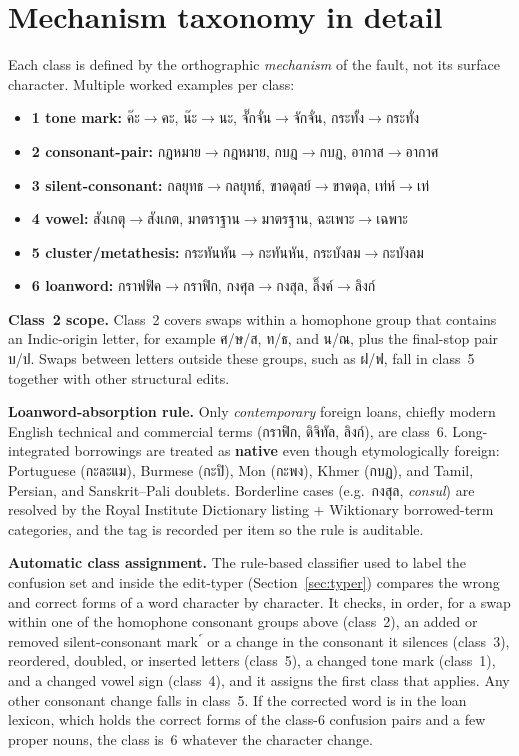 \documentclass[11pt]{article}
\begin{document}
\section{Mechanism taxonomy in detail}
\label{app:taxonomy}
Each class is defined by the orthographic \emph{mechanism} of the fault, not its surface
character. Multiple worked examples per class:
\begin{itemize}\raggedright\itemsep1pt
\item \textbf{1 tone mark:} ค๊ะ$\to$คะ, น๊ะ$\to$นะ, จั๊กจั่น$\to$จักจั่น, กระทั้ง$\to$กระทั่ง
\item \textbf{2 consonant-pair:} กฏหมาย$\to$กฎหมาย, กบฎ$\to$กบฏ, อากาส$\to$อากาศ
\item \textbf{3 silent-consonant:} กลยุทธ$\to$กลยุทธ์, ขาดดุลย์$\to$ขาดดุล, เท่ห์$\to$เท่
\item \textbf{4 vowel:} สังเกตุ$\to$สังเกต, มาตราฐาน$\to$มาตรฐาน, ฉะเพาะ$\to$เฉพาะ
\item \textbf{5 cluster/metathesis:} กระทันหัน$\to$กะทันหัน, กระบังลม$\to$กะบังลม
\item \textbf{6 loanword:} กราฟฟิค$\to$กราฟิก, กงศุล$\to$กงสุล, ลิ๊งค์$\to$ลิงก์
\end{itemize}
\textbf{Class~2 scope.} Class~2 covers swaps within a homophone group that contains an
Indic-origin letter, for example ศ/ษ/ส, ท/ธ, and น/ณ, plus the final-stop pair บ/ป. Swaps between letters outside these
groups, such as ฝ/ฟ, fall in class~5 together with other structural edits.

\textbf{Loanword-absorption rule.} Only \emph{contemporary} foreign loans, chiefly modern
English technical and commercial terms (กราฟิก, ดิจิทัล, ลิงก์), are class~6. Long-integrated
borrowings are treated as \textbf{native} even though etymologically foreign: Portuguese
(กะละแม), Burmese (กะปิ), Mon (กะพง), Khmer (กบฏ), and Tamil, Persian, and Sanskrit--Pali
doublets. Borderline cases (e.g.\ กงสุล, \emph{consul}) are resolved by the Royal Institute Dictionary listing $+$
Wiktionary borrowed-term categories, and the tag is recorded per item so the rule is auditable.

\textbf{Automatic class assignment.} The rule-based classifier used to label the confusion set
and inside the edit-typer (Section~\ref{sec:typer}) compares the wrong and correct forms of a
word character by character. It checks, in order, for a swap within one of the homophone
consonant groups above (class~2), an added or removed silent-consonant mark ์ or a change in
the consonant it silences (class~3), reordered, doubled, or inserted letters (class~5), a
changed tone mark (class~1), and a changed vowel sign (class~4), and it assigns the first class
that applies. Any other consonant change falls in class~5. If the corrected word is in the loan
lexicon, which holds the correct forms of the class-6 confusion pairs and a few proper nouns, the
class is~6 whatever the character change.
\end{document}
